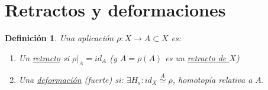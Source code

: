 \documentclass[10pt,a4paper,openright]{book}
\theoremstyle{break}
\newtheorem*{defi}{Definición}
\begin{document}
\section{Retractos y deformaciones}%
\label{sec:retractos_y_deformaciones}
\begin{defi}
Una aplicación $\rho: X \rightarrow A \subset X$ es:
\begin{enumerate}
    \item Un \underline{retracto} si $\rho|_A = id_A$ (y $A = \rho\left( A \right)$ es un \underline{retracto de $X$})
    \item Una \underline{deformación} (fuerte) si: $\exists H_s: id_X \stackrel{A}{\simeq} \rho$, homotopía relativa a $A$.
\end{enumerate}
\end{defi}
\end{document}
